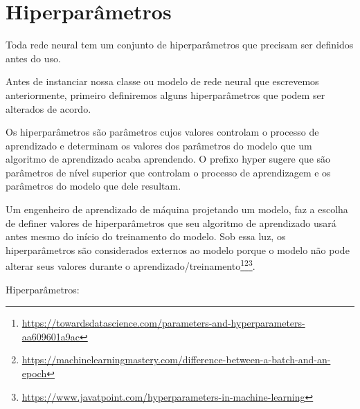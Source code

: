\section[Hiperparâmetros]{Hiperparâmetros}
Toda rede neural tem um conjunto de hiperparâmetros que precisam ser definidos antes do uso.

Antes de instanciar nossa classe ou modelo de rede neural que escrevemos anteriormente, primeiro definiremos alguns hiperparâmetros que podem ser alterados de acordo.

Os hiperparâmetros são parâmetros cujos valores controlam o processo de aprendizado e determinam os valores dos parâmetros do modelo que um algoritmo de aprendizado acaba aprendendo. O prefixo hyper sugere que são parâmetros de nível superior que controlam o processo de aprendizagem e os parâmetros do modelo que dele resultam.

Um engenheiro de aprendizado de máquina projetando um modelo, faz a escolha de definer valores de hiperparâmetros que seu algoritmo de aprendizado usará antes mesmo do início do treinamento do modelo. Sob essa luz, os hiperparâmetros são considerados externos ao modelo porque o modelo não pode alterar seus valores durante o aprendizado/treinamento\footnote{\url{https://towardsdatascience.com/parameters-and-hyperparameters-aa609601a9ac}}\footnote{\url{https://machinelearningmastery.com/difference-between-a-batch-and-an-epoch}}\footnote{\url{https://www.javatpoint.com/hyperparameters-in-machine-learning}}.


Hiperparâmetros:



